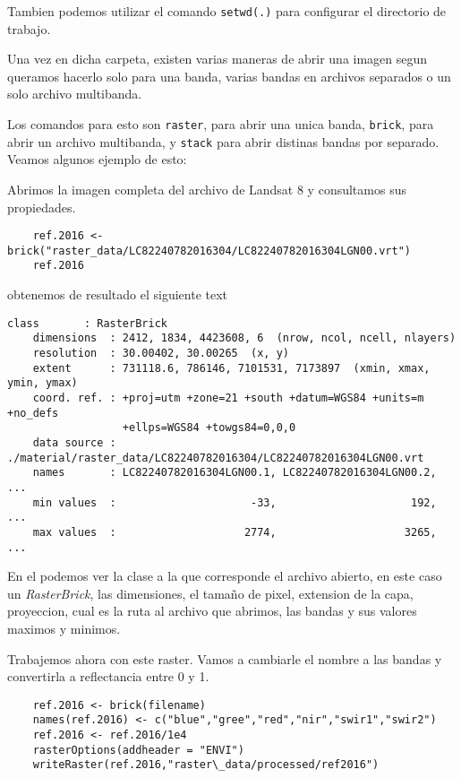 Tambien podemos utilizar el comando \texttt{setwd(.)} para configurar el
directorio de trabajo.

Una vez en dicha carpeta, existen varias maneras de abrir una imagen segun
queramos hacerlo solo para una banda, varias bandas en archivos separados o un
solo archivo multibanda.

Los comandos para esto son \texttt{raster}, para abrir una unica banda,
\texttt{brick}, para abrir un archivo multibanda, y \texttt{stack} para abrir
distinas bandas por separado. Veamos algunos ejemplo de esto:

\begin{exa}
    Abrimos la imagen completa del archivo de Landsat 8 y consultamos sus
    propiedades.
    \begin{lstlisting}
    ref.2016 <- brick("raster_data/LC82240782016304/LC82240782016304LGN00.vrt")
    ref.2016
    \end{lstlisting}
    obtenemos de resultado el siguiente text
    \begin{Verbatim}[fontsize=\small]
    class       : RasterBrick
    dimensions  : 2412, 1834, 4423608, 6  (nrow, ncol, ncell, nlayers)
    resolution  : 30.00402, 30.00265  (x, y)
    extent      : 731118.6, 786146, 7101531, 7173897  (xmin, xmax, ymin, ymax)
    coord. ref. : +proj=utm +zone=21 +south +datum=WGS84 +units=m +no_defs
                  +ellps=WGS84 +towgs84=0,0,0
    data source : ./material/raster_data/LC82240782016304/LC82240782016304LGN00.vrt
    names       : LC82240782016304LGN00.1, LC82240782016304LGN00.2, ...
    min values  :                     -33,                     192, ...
    max values  :                    2774,                    3265, ...
    \end{Verbatim}
    En el podemos ver la clase a la que corresponde el archivo abierto, en este
    caso un \emph{RasterBrick}, las dimensiones, el tamaño de pixel, extension
    de la capa, proyeccion, cual es la ruta al archivo que abrimos, las bandas y
    sus valores maximos y minimos.

    Trabajemos ahora con este raster. Vamos a cambiarle el nombre a las bandas
    y convertirla a reflectancia entre 0 y 1.

    \begin{lstlisting}
    ref.2016 <- brick(filename)
    names(ref.2016) <- c("blue","gree","red","nir","swir1","swir2")
    ref.2016 <- ref.2016/1e4
    rasterOptions(addheader = "ENVI")
    writeRaster(ref.2016,"raster\_data/processed/ref2016")
    \end{lstlisting}


\end{exa}
